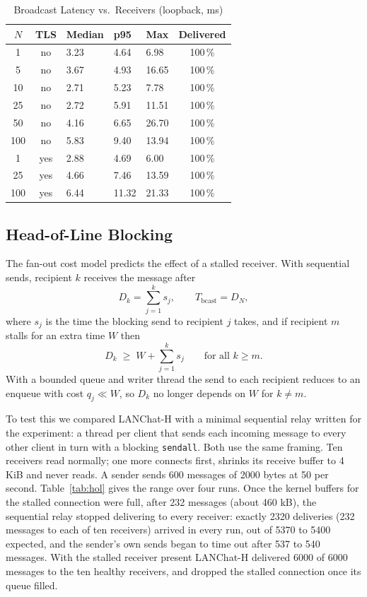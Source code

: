 \documentclass[conference]{IEEEtran}
\newcommand{\code}[1]{\texttt{#1}}
\begin{document}
\begin{table}[t]
\centering
\caption{Broadcast Latency vs.\ Receivers (loopback, ms)}
\label{tab:fanout}
\footnotesize
\begin{tabularx}{\columnwidth}{@{}c c Y Y Y c@{}}
\toprule
$N$ & TLS & \textbf{Median} & \textbf{p95} & \textbf{Max} & Delivered \\
 & no & 3.23 & 4.64 & 6.98 & 100\,\% \\
5 & no & 3.67 & 4.93 & 16.65 & 100\,\% \\
10 & no & 2.71 & 5.23 & 7.78 & 100\,\% \\
25 & no & 2.72 & 5.91 & 11.51 & 100\,\% \\
50 & no & 4.16 & 6.65 & 26.70 & 100\,\% \\
100 & no & 5.83 & 9.40 & 13.94 & 100\,\% \\
1 & yes & 2.88 & 4.69 & 6.00 & 100\,\% \\
25 & yes & 4.66 & 7.46 & 13.59 & 100\,\% \\
100 & yes & 6.44 & 11.32 & 21.33 & 100\,\% \\
\bottomrule
\end{tabularx}
\end{table}

\subsection{Head-of-Line Blocking}
The fan-out cost model predicts the effect of a stalled receiver. With sequential sends, recipient $k$ receives the message after
\begin{equation}
D_k = \sum_{j=1}^{k} s_j , \qquad T_{\text{bcast}} = D_N ,
\end{equation}
where $s_j$ is the time the blocking send to recipient $j$ takes, and if recipient $m$ stalls for an extra time $W$ then
\begin{equation}
D_k \;\ge\; W + \sum_{j=1}^{k} s_j \qquad \text{for all } k \ge m .
\end{equation}
With a bounded queue and writer thread the send to each recipient reduces to an enqueue with cost $q_j \ll W$, so $D_k$ no longer depends on $W$ for $k \neq m$.

To test this we compared LANChat-H with a minimal sequential relay written for the experiment: a thread per client that sends each incoming message to every other client in turn with a blocking \code{sendall}. Both use the same framing. Ten receivers read normally; one more connects first, shrinks its receive buffer to 4 KiB and never reads. A sender sends 600 messages of 2000 bytes at 50 per second. Table~\ref{tab:hol} gives the range over four runs. Once the kernel buffers for the stalled connection were full, after 232 messages (about 460 kB), the sequential relay stopped delivering to every receiver: exactly 2320 deliveries (232 messages to each of ten receivers) arrived in every run, out of 5370 to 5400 expected, and the sender's own sends began to time out after 537 to 540 messages. With the stalled receiver present LANChat-H delivered 6000 of 6000 messages to the ten healthy receivers, and dropped the stalled connection once its queue filled.
\end{document}

